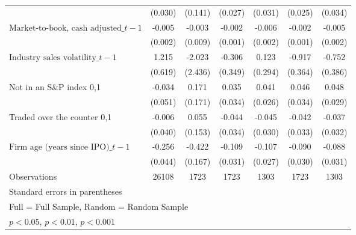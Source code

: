 {\begin{tabular}{l*{6}{c}}
                    &     (0.030)         &     (0.141)         &     (0.027)         &     (0.031)         &     (0.025)         &     (0.034)         \\
\addlinespace
$\text{Market-to-book, cash adjusted}\_{t-1}$&      -0.005\sym{**} &      -0.003         &      -0.002         &      -0.006\sym{***}&      -0.002         &      -0.005\sym{**} \\
                    &     (0.002)         &     (0.009)         &     (0.001)         &     (0.002)         &     (0.001)         &     (0.002)         \\
\addlinespace
$\text{Industry sales volatility}\_{t-1}$&       1.215\sym{*}  &      -2.023         &      -0.306         &       0.123         &      -0.917\sym{*}  &      -0.752         \\
                    &     (0.619)         &     (2.436)         &     (0.349)         &     (0.294)         &     (0.364)         &     (0.386)         \\
\addlinespace
Not in an S\&P index {0,1}&      -0.034         &       0.171         &       0.035         &       0.041         &       0.046         &       0.048         \\
                    &     (0.051)         &     (0.171)         &     (0.034)         &     (0.026)         &     (0.034)         &     (0.029)         \\
\addlinespace
Traded over the counter {0,1}&      -0.006         &       0.055         &      -0.044         &      -0.045         &      -0.042         &      -0.037         \\
                    &     (0.040)         &     (0.153)         &     (0.034)         &     (0.030)         &     (0.033)         &     (0.032)         \\
\addlinespace
$\text{Firm age (years since IPO)}\_{t-1}$&      -0.256\sym{***}&      -0.422\sym{*}  &      -0.109\sym{***}&      -0.107\sym{***}&      -0.090\sym{**} &      -0.088\sym{**} \\
                    &     (0.044)         &     (0.167)         &     (0.031)         &     (0.027)         &     (0.030)         &     (0.031)         \\
\midrule
Observations        &       26108         &        1723         &        1723         &        1303         &        1723         &        1303         \\
\bottomrule
\multicolumn{7}{l}{\footnotesize Standard errors in parentheses}\\
\multicolumn{7}{l}{\footnotesize Full = Full Sample, Random = Random Sample}\\
\multicolumn{7}{l}{\footnotesize \sym{*} \(p<0.05\), \sym{**} \(p<0.01\), \sym{***} \(p<0.001\)}\\
\end{tabular}
}
